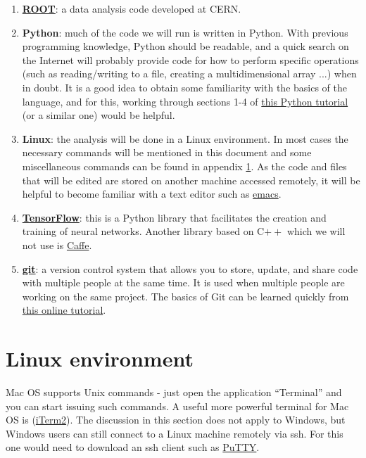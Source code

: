 \documentclass[10pt]{article}
\begin{document}
\begin{enumerate}
	\item[\textbullet] \textbf{\href{https://root.cern.ch}{ROOT}}: a data analysis code developed at CERN.
	\item[\textbullet] \textbf{Python}: much of the code we will run is written in Python.  With previous programming knowledge, 
	Python should be readable, and a quick search on the Internet will probably provide code for how to perform specific operations
	(such as reading/writing to a file, creating a multidimensional array ...) when in doubt.  It is a good idea to obtain some
	familiarity with the basics of the language, and for this, working through sections 1-4 of 
	\href{https://docs.python.org/2/tutorial/}{this Python tutorial} (or a similar one) would be helpful.  
	\item[\textbullet] \textbf{Linux}: the analysis will be done in a Linux environment.  In most cases the necessary commands
	will be mentioned in this document and some miscellaneous commands can be found in appendix \ref{s_app_linux}.  As
	the code and files that will be edited are stored on another machine accessed remotely, it will be helpful to become familiar
	with a text editor such as \href{https://www.gnu.org/software/emacs}{emacs}.
	\item[\textbullet] \textbf{\href{https://www.tensorflow.org}{TensorFlow}}: this is a Python library that facilitates the creation and 
	training of neural networks.  Another library based on C$++$ which we will not use is \href{http://caffe.berkeleyvision.org}{Caffe}.
	\item[\textbullet] \textbf{\href{https://git-scm.com}{git}}: a version control system that allows you to store, update, and share
	code with multiple people at the same time.  It is used when multiple people are working on the same project.  The basics of Git can be learned quickly from \href{https://try.github.io}{this online tutorial}.
\end{enumerate}

\section{Linux environment}\label{s_app_linux}
\noindent Mac OS supports Unix commands - just open the application ``Terminal'' and you can start issuing such commands.  A useful more powerful terminal for Mac OS is 
(\href{https://www.iterm2.com}{iTerm2}).  The discussion in this section does not apply to Windows, but Windows users can still connect to a Linux machine 
remotely via ssh.  For this one would need to download an ssh client such as \href{http://www.putty.org}{PuTTY}.
\end{document}
